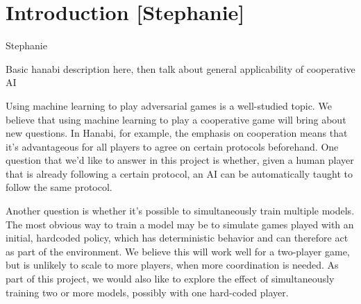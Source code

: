 \section{Introduction [Stephanie]}\label{sec:intro}

Stephanie

Basic hanabi description here, then talk about general applicability of cooperative AI

Using machine learning to play adversarial games is a well-studied topic. We believe that using machine learning to play a cooperative game will bring about new questions. In Hanabi, for example, the emphasis on cooperation means that it’s advantageous for all players to agree on certain protocols beforehand. One question that we’d like to answer in this project is whether, given a human player that is already following a certain protocol, an AI can be automatically taught to follow the same protocol.

Another question is whether it’s possible to simultaneously train multiple models. The most obvious way to train a model may be to simulate games played with an initial, hardcoded policy, which has deterministic behavior and can therefore act as part of the environment. We believe this will work well for a two-player game, but is unlikely to scale to more players, when more coordination is needed. As part of this project, we would also like to explore the effect of simultaneously training two or more models, possibly with one hard-coded player.
